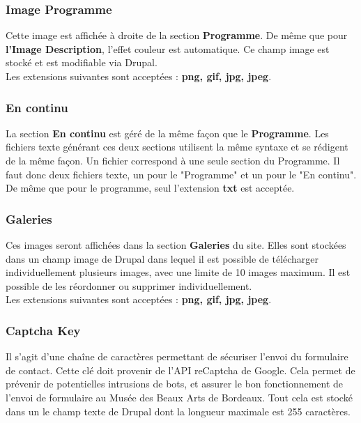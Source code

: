 \documentclass[11pt]{report}
\begin{document}
\subsubsection{Image Programme}

Cette image est affichée à droite de la section \textbf{Programme}. De même que
pour \textbf{l'Image Description}, l'effet couleur est automatique.
Ce champ image est stocké et est modifiable via Drupal. \\
Les extensions suivantes sont acceptées : \textbf{png, gif, jpg, jpeg}.

\subsubsection{En continu}

La section \textbf{En continu} est géré de la même façon que le \textbf{Programme}.
Les fichiers texte générant ces deux sections utilisent la même syntaxe et se
rédigent de la même façon. Un fichier correspond à une seule section du Programme.
Il faut donc deux fichiers texte, un pour le "Programme" et un pour le "En continu".
De même que pour le programme, seul l'extension \textbf{txt} est acceptée.

\subsubsection{Galeries}

Ces images seront affichées dans la section \textbf{Galeries} du site. Elles sont
stockées dans un champ image de Drupal dans lequel il est possible de télécharger
individuellement plusieurs images, avec une limite de 10 images maximum.
Il est possible de les réordonner ou supprimer individuellement. \\
Les extensions suivantes sont acceptées : \textbf{png, gif, jpg, jpeg}.

\subsubsection{Captcha Key}

Il s'agit d'une chaîne de caractères permettant de sécuriser l'envoi du formulaire
de contact. Cette clé doit provenir de l'API reCaptcha de Google. Cela permet de
prévenir de potentielles intrusions de bots, et assurer le bon fonctionnement
de l'envoi de formulaire au Musée des Beaux Arts de Bordeaux.
Tout cela est stocké dans un le champ texte de Drupal dont la longueur maximale
est 255 caractères.
\end{document}

